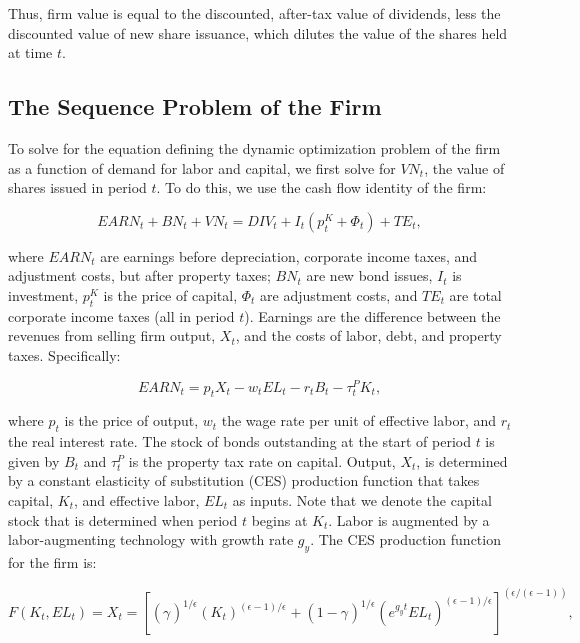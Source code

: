 Thus, firm value is equal to the discounted, after-tax value of dividends, less the discounted value of new share issuance, which dilutes the value of the shares held at time $t$. 

\subsection{The Sequence Problem of the Firm}

To solve for the equation defining the dynamic optimization problem of the firm as a function of demand for labor and capital, we first solve for $VN_{t}$, the value of shares issued in period $t$.  To do this, we use the cash flow identity of the firm: 

\begin{equation}
\label{eqn:vn}
EARN_{t}+BN_{t}+VN_{t}=DIV_{t}+I_{t}(p^{K}_{t}+\Phi_{t})+TE_{t}, 
\end{equation}

\noindent\noindent where $EARN_{t}$ are earnings before depreciation, corporate income taxes, and adjustment costs, but after property taxes; $BN_{t}$ are new bond issues, $I_{t}$ is investment, $p^{K}_{t}$ is the price of capital, $\Phi_{t}$ are adjustment costs, and $TE_{t}$ are total corporate income taxes (all in period $t$).  Earnings are the difference between the revenues from selling firm output, $X_{t}$, and the costs of labor, debt, and property taxes.  Specifically:    

\begin{equation}
\label{eqn:earn}
EARN_{t}=p_{t}X_{t}-w_{t}EL_{t}-r_{t}B_{t}-\tau^{P}_{t}K_{t},
\end{equation}

\noindent\noindent where $p_{t}$ is the price of output, $w_{t}$ the wage rate per unit of effective labor, and $r_{t}$ the real interest rate.  The stock of bonds outstanding at the start of period $t$ is given by $B_{t}$ and $\tau^{P}_{t}$ is the property tax rate on capital.  Output, $X_{t}$, is determined by a constant elasticity of substitution (CES) production function that takes capital, $K_{t}$, and effective labor, $EL_{t}$ as inputs. Note that we denote the capital stock that is determined when period $t$ begins at $K_{t}$.  Labor is augmented by a labor-augmenting technology with growth rate $g_{y}$.  The CES production function for the firm is:

\begin{equation}
\label{eqn:prod_fun}
F(K_{t},EL_{t})=X_{t} = \left[(\gamma_{})^{1/\epsilon_{}}(K_{t})^{(\epsilon-1)/\epsilon_{}}+(1-\gamma_{})^{1/\epsilon_{}}(e^{g_{y}t}EL_{t})^{(\epsilon_{}-1)/\epsilon_{}}\right]^{(\epsilon_{}/(\epsilon_{}-1))},
\end{equation}

